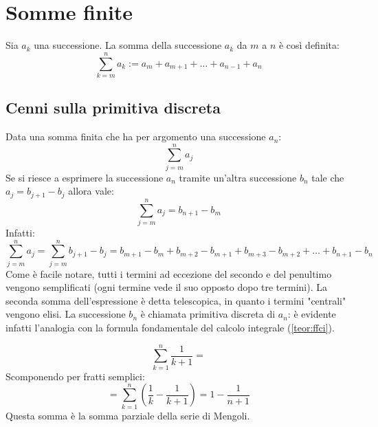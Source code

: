 %
%
%
%


\section{Somme finite}
\begin{defin}
	Sia $a_k$ una successione. La somma della successione $a_k$ da $m$ a $n$ è così definita:
	\[
		\sum_{k=m}^n a_k:= a_m+a_{m+1}+\dots+a_{n-1}+a_n
	\]
\end{defin}


\subsection{Cenni sulla primitiva discreta}
\label{sum:tele}
Data una somma finita che ha per argomento una successione $a_n$:
\[
	\sum_{j=m}^n a_j
\]
Se si riesce a esprimere la successione $a_n$ tramite un'altra successione $b_n$ tale che $a_j=b_{j+1}-b_j$ allora vale:
\[
	\sum_{j=m}^n a_j=b_{n+1}-b_m
\]
Infatti:
\[
	\sum_{j=m}^n a_j=\sum_{j=m}^n b_{j+1}-b_j=b_{m+1}-b_m+b_{m+2}-b_{m+1}+b_{m+3}-b_{m+2}+\dots+b_{n+1}-b_n
\]
Come è facile notare, tutti i termini ad eccezione del secondo e del penultimo vengono semplificati (ogni termine vede il suo opposto dopo tre termini). La seconda somma dell'espressione è detta telescopica, in quanto i termini "centrali" vengono elisi. La successione $b_n$ è chiamata primitiva discreta di $a_n$: è evidente infatti l'analogia con la formula fondamentale del calcolo integrale (\vref{teor:ffci}).

\begin{examp}
	\[
		\sum_{k=1}^n\frac{1}{k+1}=
	\]
	Scomponendo per fratti semplici:
	\[
		=\sum_{k=1}^n\left(\frac{1}{k}-\frac{1}{k+1}\right)=1-\frac{1}{n+1}
	\]
	Questa somma è la somma parziale della serie di Mengoli.
\end{examp}


